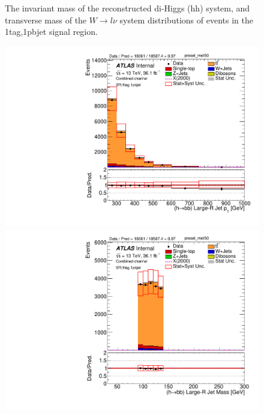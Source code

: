 \begin{figure}[!htbp]
\begin{center}
\caption{The invariant mass of the reconstructed di-Higgs (hh) system, \met and transverse mass of the $W \to l\nu$ system 
distributions of events in the 1tag,1pbjet signal region.}
\label{fig:boosted_SR_1tag_1pbjet_mainplots}
\end{center}
\end{figure}

\begin{figure}[!htbp]
\begin{center}
\includegraphics[scale=0.33]{./figures/boosted/Plot1tag1pbjet/DataMC_1tag_1pbjet_SR_lepton_presel_met50_HbbPt}
\includegraphics[scale=0.33]{./figures/boosted/Plot1tag1pbjet/DataMC_1tag_1pbjet_SR_lepton_presel_met50_HbbMass}\\
\par\medskip

\end{center}
\end{figure}
